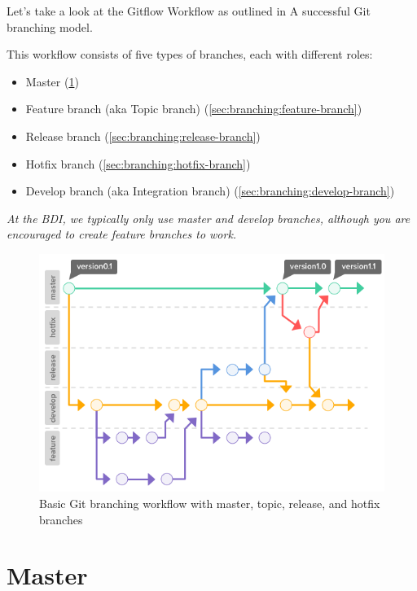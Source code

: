 \documentclass[10pt,a4paper,english]{report}
\begin{document}
    Let's take a look at the Gitflow Workflow as outlined in A successful Git branching model.

    This workflow consists of five types of branches, each with different roles:
    \begin{itemize}
        \item Master (\ref{sec:branching:master})
        \item Feature branch (aka Topic branch) (\ref{sec:branching:feature-branch})
        \item Release branch (\ref{sec:branching:release-branch})
        \item Hotfix branch (\ref{sec:branching:hotfix-branch})
        \item Develop branch (aka Integration branch) (\ref{sec:branching:develop-branch})
    \end{itemize}

    \emph{At the BDI, we typically only use master and develop branches, although you are encouraged to create feature branches to work.}

    \begin{figure}[ht]
    \begin{center}
    \includegraphics[scale=0.5]{images/branching_workflows_001.png}
    \end{center}
    \caption{Basic Git branching workflow with master, topic, release, and hotfix branches}
    \end{figure}

    \section{Master}
    \label{sec:branching:master}
\end{document}
